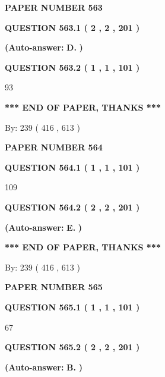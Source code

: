 \documentclass{ctexart}
\begin{document}
   
 {\textbf{ \Large{ PAPER NUMBER  563  }}}
   
   
   
   
  
  
{\textbf{\large{QUESTION
563.1 
 ( 2 , 2 , 201 )
}}}
 
 
{\textbf{(Auto-answer:}}
{\textbf{\large{
D.}}}
{\textbf{)}}
 
 
  
  
{\textbf{\large{QUESTION
563.2 
 ( 1 , 1 , 101 )
}}}

93
   
   
   
   
\vspace{1.0in} 
{\textbf{\large{ *** END OF PAPER, THANKS *** }}} 
   
   
\hspace{1.0in} By: 
 239 ( 416 ,  613 )
   
   
   
   
\newpage 
\setcounter{page}{ 
   564001 } 
   
   
 {\textbf{ \Large{ PAPER NUMBER  564  }}}
   
   
   
   
  
  
{\textbf{\large{QUESTION
564.1 
 ( 1 , 1 , 101 )
}}}

109
  
  
{\textbf{\large{QUESTION
564.2 
 ( 2 , 2 , 201 )
}}}
 
 
{\textbf{(Auto-answer:}}
{\textbf{\large{
E.}}}
{\textbf{)}}
 
 
   
   
   
   
\vspace{1.0in} 
{\textbf{\large{ *** END OF PAPER, THANKS *** }}} 
   
   
\hspace{1.0in} By: 
 239 ( 416 ,  613 )
   
   
   
   
\newpage 
\setcounter{page}{ 
   565001 } 
   
   
 {\textbf{ \Large{ PAPER NUMBER  565  }}}
   
   
   
   
  
  
{\textbf{\large{QUESTION
565.1 
 ( 1 , 1 , 101 )
}}}

67
  
  
{\textbf{\large{QUESTION
565.2 
 ( 2 , 2 , 201 )
}}}
 
 
{\textbf{(Auto-answer:}}
{\textbf{\large{
B.}}}
{\textbf{)}}
 
\end{document}
